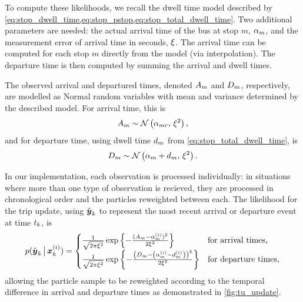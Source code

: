 To compute these likelihoods, we recall the dwell time model described by \cref{eq:stop_dwell_time,eq:stop_pstop,eq:stop_total_dwell_time}. Two additional parameters are needed: the actual arrival time of the bus at stop $m$, $\alpha_{m}$, and the measurement error of arrival time in seconds, $\xi$. The arrival time can be computed for each stop $m$ directly from the model (via interpolation). The departure time is then computed by summing the arrival and dwell times.


The observed arrival and departured times, denoted $A_m$ and $D_m$, respectively, are modelled as Normal random variables with mean and variance determined by the described model. For arrival time, this is
\begin{equation}
\label{eq:tu_arr_lhood}
A_m \sim \mathcal{N}\left(\alpha_{mr},\, \xi^2\right),
\end{equation}
and for departure time, using dwell time $d_m$ from \cref{eq:stop_total_dwell_time}, is
\begin{equation}
\label{eq:tu_dep_lhood}
D_m \sim \mathcal{N}\left(\alpha_m + d_m,\, \xi^2\right).
\end{equation}


In our \pf{} implementation, each observation is processed individually: in situations where more than one type of observation is recieved, they are processed in chronological order and the particles reweighted between each. The likelihood for the trip update, using $\tilde{\boldsymbol{y}}_k$ to represent the most recent arrival or departure event at time $t_k$, is
\begin{equation}
\label{eq:tu_obs_lhood}
p(\tilde{\boldsymbol{y}}_k \,\big|\,{} \boldsymbol x^{(i)}_k) =
\begin{cases}
\frac{1}{\sqrt{2\pi\xi^2}}
    \exp\left\{
        -\frac{(A_m - \alpha^{(i)}_m)^2}{2\xi^2}
    \right\} & \text{for arrival times,} \\
\frac{1}{\sqrt{2\pi\xi^2}}
    \exp\left\{
        -\frac{\left(D_m - \left(\alpha^{(i)}_m - d^{(i)}_m\right)\right)^2}{2\xi^2}
    \right\} & \text{for departure times,}
\end{cases}
\end{equation}
allowing the particle sample to be reweighted according to the temporal difference in arrival and departure times as demonstrated in \cref{fig:tu_update}.

